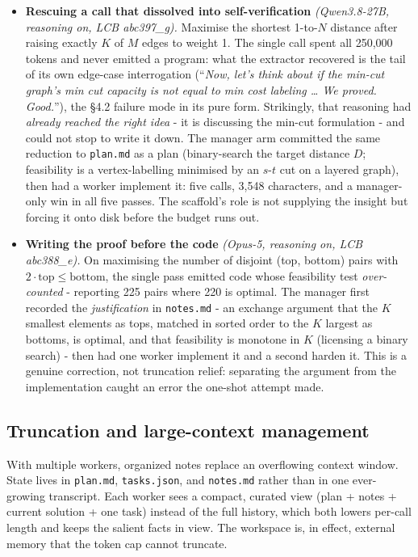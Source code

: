 \documentclass[11pt]{article}
\begin{document}
\begin{itemize}
  \item \textbf{Rescuing a call that dissolved into self-verification}
  \textit{(Qwen3.8-27B, reasoning on, LCB abc397\_g).} Maximise the shortest 1-to-$N$
  distance after raising exactly $K$ of $M$ edges to weight 1. The single call spent all
  250{,}000 tokens and never emitted a program: what the extractor recovered is the tail of
  its own edge-case interrogation (``\textit{Now, let's think about if the min-cut graph's
  min cut capacity is not equal to min cost labeling \dots{} We proved. Good.}''), the
  \S4.2 failure mode in its pure form. Strikingly, that reasoning had \textit{already
  reached the right idea} - it is discussing the min-cut formulation - and could not stop to
  write it down. The manager arm committed the same reduction to \texttt{plan.md} as a
  plan (binary-search the target distance $D$; feasibility is a vertex-labelling minimised
  by an $s$-$t$ cut on a layered graph), then had a worker implement it: five calls,
  3{,}548 characters, and a manager-only win in all five passes. The scaffold's
  role is not supplying the insight but forcing it onto disk before the budget runs out.

  \item \textbf{Writing the proof before the code} \textit{(Opus-5, reasoning on, LCB
  abc388\_e).} On maximising the number of disjoint (top, bottom) pairs with
  $2\cdot\text{top} \le \text{bottom}$, the single pass emitted code whose feasibility test
  \textit{over-counted} - reporting 225 pairs where 220 is optimal. The manager first
  recorded the \textit{justification} in \texttt{notes.md} - an exchange argument that
  the $K$ smallest elements as tops, matched in sorted order to the $K$ largest as
  bottoms, is optimal, and that feasibility is monotone in $K$ (licensing a binary search)
  - then had one worker implement it and a second harden it. This is a genuine
  correction, not truncation relief: separating the argument from the implementation
  caught an error the one-shot attempt made.
\end{itemize}

\subsection{Truncation and large-context management}

With multiple workers, organized notes replace an overflowing context window. State lives
in \texttt{plan.md}, \texttt{tasks.json}, and \texttt{notes.md} rather than in one
ever-growing transcript. Each worker sees a compact, curated view (plan + notes + current
solution + one task) instead of the full history, which both lowers per-call length and
keeps the salient facts in view. The workspace is, in effect, external memory that the
token cap cannot truncate.
\end{document}
